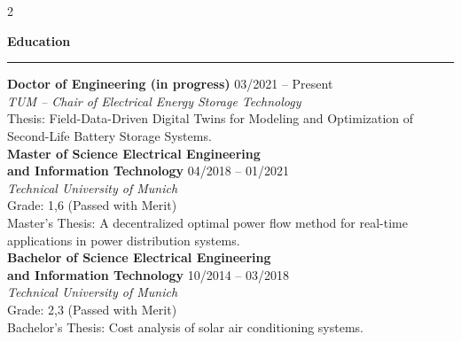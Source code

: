 \documentclass[11pt,a4paper]{article}
\newcommand{\rightsection}[1]{
    \vspace{0.8em}
    {\large\bfseries #1}\\
    \vspace{0.2em}
    \noindent\hspace*{-0.4cm}\rule{\dimexpr\linewidth+0.4cm\relax}{0.4pt}
    \vspace{0.4em}
}
\newcommand{\entry}[4]{
    \textbf{#1} \hfill {#2}\\
    \textit{#3} \hfill \textit{#4}\\
}
\newlength{\mainpad}
\newlength{\leftpanelwd}
\begin{document}
\begin{paracol}{2}
\begin{adjustwidth}{\mainpad}{\mainpad}
        \vspace{0.1cm}
        \rightsection{Education}
        \entry{Doctor of Engineering (in progress)}{03/2021 -- Present}
        {TUM -- Chair of Electrical Energy Storage Technology}{}
        Thesis: Field-Data-Driven Digital Twins for Modeling and Optimization of Second-Life Battery Storage Systems.
        \\[0.2cm]

        \entry{Master of Science Electrical Engineering \\and Information Technology}{04/2018 -- 01/2021}
        {Technical University of Munich}{}
        Grade: 1,6 (Passed with Merit) \\
        Master's Thesis: A decentralized optimal power flow method for real-time \\applications in power distribution systems.\\[0.2cm]

        \entry{Bachelor of Science Electrical Engineering \\and Information Technology}{10/2014 -- 03/2018}
        {Technical University of Munich}{}
        Grade: 2,3 (Passed with Merit) \\
        Bachelor's Thesis: Cost analysis of solar air conditioning systems.



    \end{adjustwidth}

\end{paracol}

\end{document}

